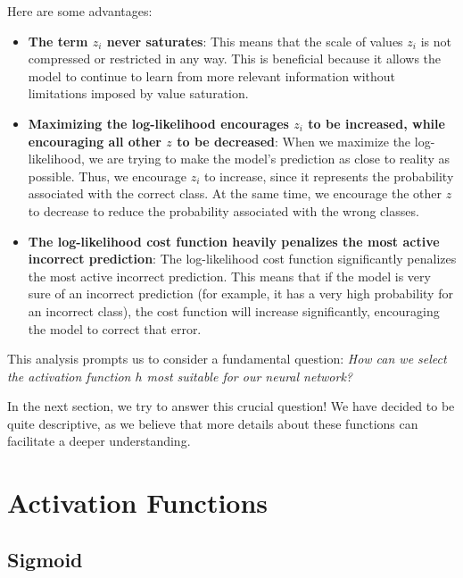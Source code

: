 Here are some advantages:
\begin{itemize}
    \item \textbf{The term \( z_i \) never saturates}: This means that the scale of values \( z_i \) is not compressed or restricted in any way. This is beneficial because it allows the model to continue to learn from more relevant information without limitations imposed by value saturation.
    
    \item \textbf{Maximizing the log-likelihood encourages \( z_i \) to be increased, while encouraging all other \( z \) to be decreased}: When we maximize the log-likelihood, we are trying to make the model's prediction as close to reality as possible. Thus, we encourage \( z_i \) to increase, since it represents the probability associated with the correct class. At the same time, we encourage the other \( z \) to decrease to reduce the probability associated with the wrong classes.
    
    \item \textbf{The log-likelihood cost function heavily penalizes the most active incorrect prediction}: The log-likelihood cost function significantly penalizes the most active incorrect prediction. This means that if the model is very sure of an incorrect prediction (for example, it has a very high probability for an incorrect class), the cost function will increase significantly, encouraging the model to correct that error.
\end{itemize}

This analysis prompts us to consider a fundamental question: \textit{How can we select the activation function $h$ most suitable for our neural network?}

In the next section, we try to answer this crucial question! 
We have decided to be quite descriptive, as we believe that more details about these functions can facilitate a deeper understanding.

\section{Activation Functions}

\subsection{Sigmoid}

